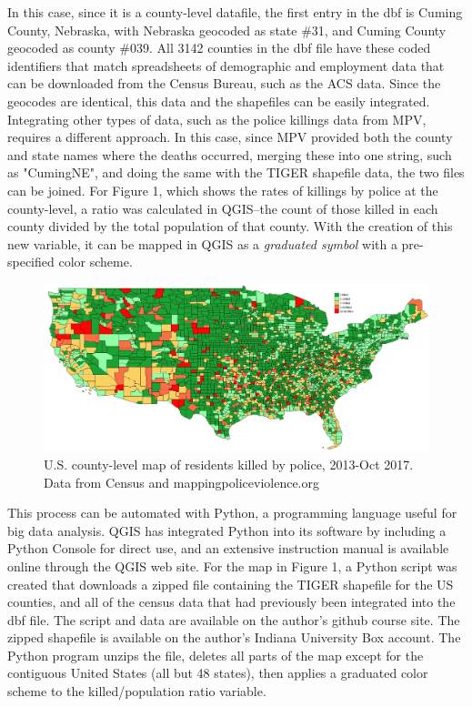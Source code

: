 \documentclass[sigconf]{acmart}
\begin{document}
In this case, since it is a county-level datafile, the first entry in the dbf is Cuming County, Nebraska, with Nebraska geocoded as state \#31, and Cuming County geocoded as county \#039.  All 3142 counties in the dbf file have these coded identifiers that match spreadsheets of demographic and employment data that can be downloaded from the Census Bureau, such as the ACS data.  Since the geocodes are identical, this data and the shapefiles can be easily integrated.  Integrating other types of data, such as the police killings data from MPV, requires a different approach.  In this case, since MPV provided both the county and state names where the deaths occurred, merging these into one string, such as "CumingNE", and doing the same with the TIGER shapefile data, the two files can be joined.  For Figure 1, which shows the rates of killings by police at the county-level, a ratio was calculated in QGIS--the count of those killed in each county divided by the total population of that county.  With the creation of this new variable, it can be mapped in QGIS as a {\em graduated symbol} with a pre-specified color scheme. 

\begin{figure}
\includegraphics[width=1.0\textwidth]{images/figure1.jpg}
\caption{U.S. county-level map of residents killed by police, 2013-Oct 2017.  Data from Census and mappingpoliceviolence.org}
\end{figure}

This process can be automated with Python, a programming language useful for big data analysis. \cite{python}  QGIS has integrated Python into its software by including a Python Console for direct use, and an extensive instruction manual is available online through the QGIS web site. \cite{pyqgis}  For the map in Figure 1, a Python script was created that downloads a zipped file containing the TIGER shapefile for the US counties, and all of the census data that had previously been integrated into the dbf file. The script and data are available on the author's github course site. \cite{townsley} The zipped shapefile is available on the author's Indiana University Box account. \cite{townsley2} The Python program unzips the file, deletes all parts of the map except for the contiguous United States (all but 48 states), then applies a graduated color scheme to the killed/population ratio variable.
\end{document}
